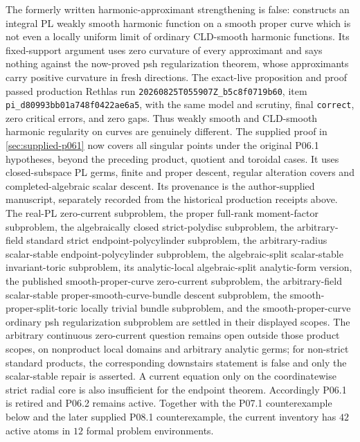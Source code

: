The formerly written harmonic-approximant strengthening is false:
 constructs an integral
PL weakly smooth harmonic function on a smooth proper curve which is not even
a locally uniform limit of ordinary CLD-smooth harmonic functions.  Its
fixed-support argument uses zero curvature of every approximant and says
nothing against the now-proved psh regularization theorem, whose approximants
carry positive curvature in fresh directions.
The exact-live proposition and proof passed production Rethlas run
\nolinkurl{20260825T055907Z_b5c8f0719b60}, item
\nolinkurl{pi_d80993bb01a748f0422ae6a5}, with the same model and scrutiny,
final \texttt{correct}, zero critical errors, and zero gaps.  Thus weakly
smooth and CLD-smooth harmonic regularity on curves are genuinely different.
The supplied proof in \cref{sec:supplied-p061} now covers all singular
points under the original P06.1 hypotheses, beyond the preceding product,
quotient and toroidal cases. It uses closed-subspace PL germs, finite and
proper descent, regular alteration covers and completed-algebraic scalar
descent. Its provenance is the author-supplied manuscript, separately
recorded from the historical production receipts above.
The real-PL zero-current subproblem, the proper
full-rank moment-factor subproblem, the algebraically closed strict-polydisc
subproblem, the arbitrary-field standard strict endpoint-polycylinder
subproblem,
the arbitrary-radius scalar-stable endpoint-polycylinder subproblem,
the algebraic-split scalar-stable invariant-toric subproblem,
its analytic-local algebraic-split analytic-form version,
the published smooth-proper-curve zero-current subproblem,
the arbitrary-field scalar-stable proper-smooth-curve-bundle descent
subproblem,
the smooth-proper-split-toric locally trivial bundle subproblem, and the
smooth-proper-curve ordinary psh
regularization subproblem are settled in their displayed scopes.  The
arbitrary continuous zero-current question remains open outside those
product scopes, on nonproduct local domains and arbitrary analytic germs;
for non-strict standard products, the corresponding downstairs statement is
false and only the scalar-stable repair is asserted.  A current equation only
on the coordinatewise strict radial core is also insufficient for the
endpoint theorem.
Accordingly P06.1 is retired and P06.2 remains active. Together with the
P07.1 counterexample below and the later supplied P08.1 counterexample, the
current inventory has \(42\) active atoms in \(12\) formal problem environments.

